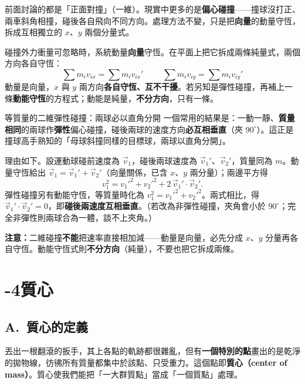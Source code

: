 \documentclass[11pt]{article}
\begin{document}
前面討論的都是「正面對撞」（一維）。現實中更多的是\textbf{偏心碰撞}——撞球沒打正、兩車斜角相撞，碰後各自飛向不同方向。處理方法不變，只是把\textbf{向量}的動量守恆，拆成互相獨立的 $x$、$y$ 兩個分量式。

碰撞外力衝量可忽略時，系統動量\textbf{向量}守恆。在平面上把它拆成兩條純量式，兩個方向各自守恆：
$$\boxed{\,\sum m_i v_{ix}=\sum m_i v_{ix}'\,}\qquad\boxed{\,\sum m_i v_{iy}=\sum m_i v_{iy}'\,}$$
動量是向量，$x$ 與 $y$ 兩方向\textbf{各自守恆、互不干擾}。若另知是彈性碰撞，再補上一條\textbf{動能守恆}的方程式；動能是純量，\textbf{不分方向}，只有一條。


\begin{補充框}{等質量的二維彈性碰撞：兩球必以直角分開}
一個常用的結果是：一動一靜、\textbf{質量相同}的兩球作\textbf{彈性}偏心碰撞，碰後兩球的速度方向\textbf{必互相垂直}（夾 $90^\circ$）。這正是撞球高手熟知的「母球斜撞同樣的目標球，兩球以直角分開」。

理由如下。設運動球碰前速度為 $\vec v_1$，碰後兩球速度為 $\vec v_1'$、$\vec v_2'$，質量同為 $m$。動量守恆給出 $\vec v_1=\vec v_1'+\vec v_2'$（向量關係，已含 $x$、$y$ 兩分量）；兩邊平方得
$$v_1^2=v_1'^2+v_2'^2+2\,\vec v_1'\!\cdot\!\vec v_2'.$$
彈性碰撞另有動能守恆，等質量時化為 $v_1^2=v_1'^2+v_2'^2$。兩式相比，得 $\vec v_1'\!\cdot\!\vec v_2'=0$，即\textbf{碰後兩速度互相垂直}。（若改為非彈性碰撞，夾角會小於 $90^\circ$；完全非彈性則兩球合為一體，談不上夾角。）
\end{補充框}

\textbf{注意：}二維碰撞\textbf{不能}把速率直接相加減——動量是向量，必先分成 $x$、$y$ 分量再各自守恆。動能守恆式則\textbf{不分方向}（純量），不要也把它拆成兩條。

\section*{-4\quad 質心}

\subsection*{\sffamily A.\ 質心的定義}

丟出一根翻滾的扳手，其上各點的軌跡都很雜亂，但有\textbf{一個特別的點}畫出的是乾淨的拋物線，彷彿所有質量都集中於該點、只受重力。這個點即\textbf{質心（center of mass）}。質心使我們能把「一大群質點」當成「一個質點」處理。
\end{document}

